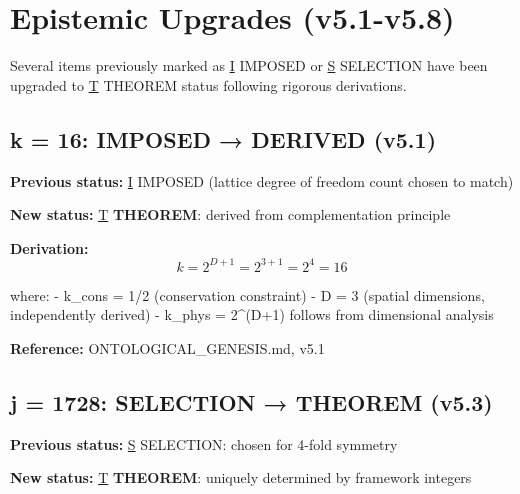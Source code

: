 \documentclass[
  11pt,
  letterpaper,
  twoside,
  openany]{book}
\makeatletter
\let\orig@section\section
\renewcommand{\section}{\needspace{8\baselineskip}\orig@section}
\let\orig@subsection\subsection
\renewcommand{\subsection}{\needspace{6\baselineskip}\orig@subsection}
\makeatother
\begin{document}
\section{Epistemic Upgrades (v5.1-v5.8)}\label{sec-epistemic-upgrades}

\begin{tcolorbox}[enhanced jigsaw, colbacktitle=quarto-callout-important-color!10!white, titlerule=0mm, bottomtitle=1mm, bottomrule=.15mm, colback=white, arc=.35mm, breakable, toprule=.15mm, title=\textcolor{quarto-callout-important-color}{\faExclamation}\hspace{0.5em}{Status Changes January 2026}, rightrule=.15mm, coltitle=black, leftrule=.75mm, colframe=quarto-callout-important-color-frame, toptitle=1mm, opacityback=0, opacitybacktitle=0.6, left=2mm]

Several items previously marked as \hyperref[i]{I} IMPOSED or
\hyperref[s]{S} SELECTION have been upgraded to \hyperref[t]{T} THEOREM
status following rigorous derivations.

\end{tcolorbox}

\subsection{k = 16: IMPOSED → DERIVED
(v5.1)}\label{k-16-imposed-derived-v5.1}

\textbf{Previous status:} \hyperref[i]{I} IMPOSED (lattice degree of
freedom count chosen to match)

\textbf{New status:} \hyperref[t]{T} \textbf{THEOREM}: derived from
complementation principle

\textbf{Derivation:} \[k = 2^{D+1} = 2^{3+1} = 2^4 = 16\]

where: - k\_cons = 1/2 (conservation constraint) - D = 3 (spatial
dimensions, independently derived) - k\_phys = 2\^{}(D+1) follows from
dimensional analysis

\textbf{Reference:} ONTOLOGICAL\_GENESIS.md, v5.1

\subsection{j = 1728: SELECTION → THEOREM
(v5.3)}\label{j-1728-selection-theorem-v5.3}

\textbf{Previous status:} \hyperref[s]{S} SELECTION: chosen for 4-fold
symmetry

\textbf{New status:} \hyperref[t]{T} \textbf{THEOREM}: uniquely
determined by framework integers
\end{document}
